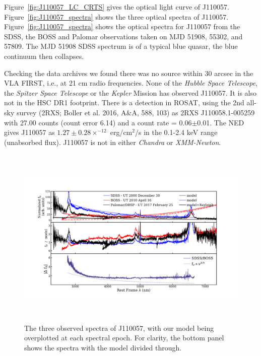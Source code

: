 \documentclass{nature}
\begin{document}
Figure~\ref{fig:J110057_LC_CRTS} gives the optical light curve of
J110057.  Figure~\ref{fig:J110057_spectra} shows the three optical
spectra of J110057. Figure~\ref{fig:J110057_spectra} shows the optical
spectra for J110057 from the SDSS, the BOSS and Palomar observations
taken on MJD 51908, 55302, and 57809. The MJD 51908 SDSS spectrum is
of a typical blue quasar, the blue continuum then collapses.

Checking the data archives we found there was no source within 30
arcsec in the VLA FIRST, i.e., at 21 cm radio frequencies.  None of
the {\it Hubble Space Telescope}, the {\it Spitzer Space Telescope} or
the {\it Kepler} Mission has observed J110057.  It is also not in the
HSC DR1 footprint.  There is a detection in ROSAT, using the 2nd
all-sky survey (2RXS; Boller et al. 2016, A\&A, 588, 103) as 2RXS
J110058.1-005259 with 27.00 counts (count error 6.14) and a count rate
= 0.06$\pm$0.01. The NED gives J110057 as $1.27\pm0.28 \times^{-12}$
erg/cm$^{2}$/s in the 0.1-2.4 keV range (unabsorbed flux). J110057 is
not in either {\it Chandra} or {\it XMM-Newton}.




\begin{figure}
  \includegraphics[width=15.4cm, height=8.75cm, trim=0.0cm 0.0cm 0.0cm 0.0cm, clip]
  {../plots/models/mcd_gap_v3_20171017v1.pdf}
  \centering
  \caption[]{The three observed spectra of J110057, with our model
    being overplotted at each spectral epoch. For clarity, the bottom
    panel shows the spectra with the model divided through. }
  \label{fig:J110057_diskmodel}
\end{figure}
\end{document}
